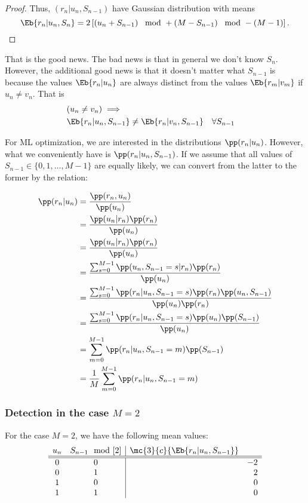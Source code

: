 \begin{proof}
Thus, $(r_n|u_n,S_{n-1})$ have Gaussian distribution with means
\[ \Eb{r_n|u_n,S_n} =  2\left[
           \left( u_n + S_{n-1} \right)\mod + \left( M   - S_{n-1}\right)\mod
           - (M - 1) \right]. \]
\end{proof}

That is the good news.
The bad news is that in general we don't know $S_n$.
However, the additional good news is that it doesn't matter what
$S_{n-1}$ is because the values $\Eb{r_n|u_n}$ are
always distinct from the values $\Eb{r_m|v_m}$
if $u_n\ne v_n$.
That is
\begin{align*}
   & (u_n\ne v_n)\implies
 \\&
   \Eb{r_n|u_n,S_{n-1}} \ne \Eb{r_n|v_n,S_{n-1}}
   && \forall S_{n-1}
\end{align*}

For ML optimization, we are interested in the distributions
$\pp(r_n|u_n)$.
However, what we conveniently have is $\pp(r_n|u_n,S_{n-1})$.
If we assume that all values of $S_{n-1}\in\{0,1,\ldots,M-1\}$
are equally likely, we can convert from the latter to the
former by the relation:

\begin{align*}
   \pp(r_n|u_n)
      &= \frac{\pp(r_n,u_n)}{\pp(u_n)}
    \\&= \frac{\pp(u_n|r_n)\pp(r_n)}
              {\pp(u_n)}
    \\&= \frac{\pp(u_n|r_n)\pp(r_n)}
              {\pp(u_n)}
    \\&= \frac{\sum_{s=0}^{M-1}\pp(u_n,S_{n-1}=s|r_n)\pp(r_n)}
              {\pp(u_n)}
    \\&= \frac{\sum_{s=0}^{M-1}\pp(r_n|u_n,S_{n-1}=s)\pp(r_n)\pp(u_n,S_{n-1})}
              {\pp(u_n)\pp(r_n)}
    \\&= \frac{\sum_{s=0}^{M-1}\pp(r_n|u_n,S_{n-1}=s)\pp(u_n)\pp(S_{n-1})}
              {\pp(u_n)}
    \\&= \sum_{m=0}^{M-1}\pp(r_n|u_n,S_{n-1}=m)\pp(S_{n-1})
    \\&= \frac{1}{M}\sum_{m=0}^{M-1}\pp(r_n|u_n,S_{n-1}=m)
\end{align*}

\subsubsection{Detection in the case $M=2$}
For the case $M=2$, we have the following mean values:
\[
\begin{array}{cc|rrr}
   u_n & S_{n-1}\mod[2] & \mc{3}{c}{\Eb{r_n|u_n,S_{n-1}}} \\
   \hline
   \hline
   0 & 0 && -2 \\
   0 & 1 &&  2 \\
   1 & 0 &&  0 \\
   1 & 1 &&  0
\end{array}
\]

